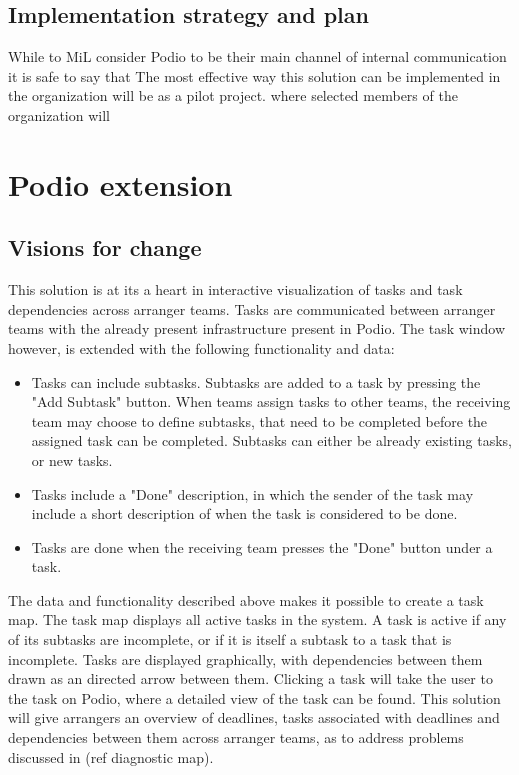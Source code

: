 \subsection{Implementation strategy and plan} 
While to MiL consider Podio to be their main channel of internal communication it is safe to say that 
The most effective way this solution can be implemented in the organization will be as a pilot project.  where selected members of the organization will 

\section{Podio extension}
\subsection{Visions for change}
\label{visions_for_change}
This solution is at its a heart in interactive visualization of tasks and task dependencies across arranger teams. Tasks are communicated between arranger teams with the already present infrastructure present in Podio. The task window however, is extended with the following functionality and data:
\begin{itemize}
    \item Tasks can include subtasks. Subtasks are added to a task by pressing the "Add Subtask" button. When teams assign tasks to other teams, the receiving team may choose to define subtasks, that need to be completed before the assigned task can be completed. Subtasks can either be already existing tasks, or new tasks.
    \item Tasks include a "Done" description, in which the sender of the task may include a short description of when the task is considered to be done.
    \item Tasks are done when the receiving team presses the "Done" button under a task.
\end{itemize}
The data and functionality described above makes it possible to create a task map. The task map displays all active tasks in the system. A task is active if any of its subtasks are incomplete, or if it is itself a subtask to a task that is incomplete. Tasks are displayed graphically, with dependencies between them drawn as an directed arrow between them. Clicking a task will take the user to the task on Podio, where a detailed view of the task can be found. This solution will give arrangers an overview of deadlines, tasks associated with deadlines and dependencies between them across arranger teams, as to address problems discussed in (ref diagnostic map).


